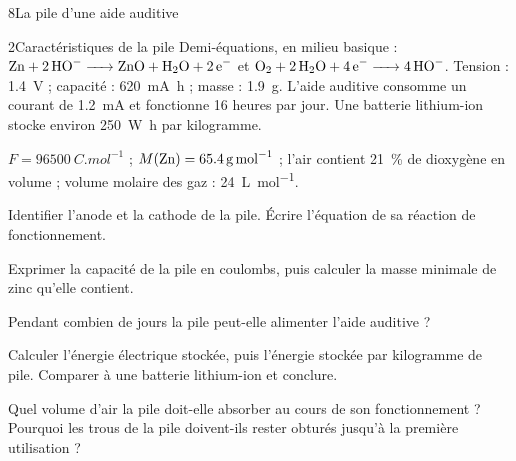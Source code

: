 \begin{exoBac}{8}{La pile d'une aide auditive}
\begin{docu}{2}{Caractéristiques de la pile}
Demi-équations, en milieu basique : $\ce{Zn + 2HO- -> ZnO + H2O + 2e-}$ et $\ce{O2 + 2H2O + 4e- -> 4HO-}$. Tension : \qty{1,4}{V} ;
capacité : \qty{620}{mA.h} ; masse : \qty{1,9}{g}. L'aide auditive consomme un courant de \qty{1,2}{mA} et fonctionne 16 heures par jour.
Une batterie lithium-ion stocke environ \qty{250}{W.h} par kilogramme.
\end{docu}
\begin{donnees}
$F=\qty{96500}{C.mol^{-1}}$ ; $M(\ce{Zn})=\qty{65,4}{g.mol^{-1}}$ ; l'air contient 21~\% de dioxygène en volume ; volume molaire des gaz :
\qty{24}{L.mol^{-1}}.
\end{donnees}
\begin{questions}[resume]
\item Identifier l'anode et la cathode de la pile. Écrire l'équation de sa réaction de fonctionnement.
\item Exprimer la capacité de la pile en coulombs, puis calculer la masse minimale de zinc qu'elle contient.
\item Pendant combien de jours la pile peut-elle alimenter l'aide auditive ?
\item Calculer l'énergie électrique stockée, puis l'énergie stockée par kilogramme de pile. Comparer à une batterie
lithium-ion et conclure.
\item \initiative Quel volume d'air la pile doit-elle absorber au cours de son fonctionnement ? Pourquoi les trous de la
pile doivent-ils rester obturés jusqu'à la première utilisation ?
\end{questions}
\end{exoBac}

